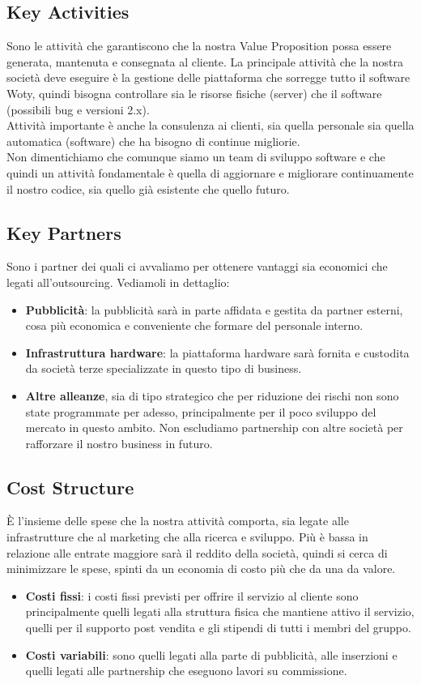\subsection{Key Activities}
Sono le attività che garantiscono che la nostra Value Proposition possa essere generata, mantenuta e consegnata al cliente. La principale attività che la nostra società deve eseguire è la gestione delle piattaforma che sorregge tutto il software Woty, quindi bisogna controllare sia le risorse fisiche (server) che il software (possibili bug e versioni 2.x).\\
Attività importante è anche la consulenza ai clienti, sia quella personale sia quella automatica (software) che ha bisogno di continue migliorie.\\
Non dimentichiamo che comunque siamo un team di sviluppo software e che quindi un attività fondamentale è quella di aggiornare e migliorare continuamente il nostro codice, sia quello già esistente che quello futuro.

\subsection{Key Partners}
Sono i partner dei quali ci avvaliamo per ottenere vantaggi sia economici che legati all'out\-sourcing. Vediamoli in dettaglio:
\begin{itemize}
\item \textbf{Pubblicità}: la pubblicità sarà in parte affidata e gestita da partner esterni, cosa più economica e conveniente che formare del personale interno.
\item \textbf{Infrastruttura hardware}: la piattaforma hardware sarà fornita e custodita da società terze specializzate in questo tipo di business.	
\item \textbf{Altre alleanze}, sia di tipo strategico che per riduzione dei rischi non sono state programmate per adesso, principalmente per il poco sviluppo del mercato in questo ambito. Non escludiamo partnership con altre società per rafforzare il nostro business in futuro.
\end{itemize}

\subsection{Cost Structure}
È l'insieme delle spese che la nostra attività comporta, sia legate alle infrastrutture che al marketing che alla ricerca e sviluppo. Più è bassa in relazione alle entrate maggiore sarà il reddito della società, quindi si cerca di minimizzare le spese, spinti da un economia di costo più che da una da valore.
\begin{itemize}
\item \textbf{Costi fissi}: i costi fissi previsti per offrire il servizio al cliente sono principalmente quelli legati alla struttura fisica che mantiene attivo il servizio, quelli per il supporto post vendita e gli stipendi di tutti i membri del gruppo.
\item \textbf{Costi variabili}: sono quelli legati alla parte di pubblicità, alle inserzioni e quelli legati alle partnership che eseguono lavori su commissione.
\end{itemize}

